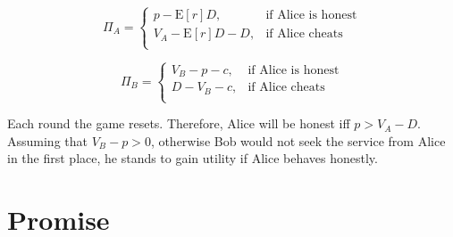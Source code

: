 \documentclass[runningheads]{llncs}
\newcommand{\sys}{Promise\xspace}
\begin{document}

\begin{equation}
\label{eq:status-quo_alice}
\Pi_A = 
\begin{cases}
    p - \mathrm{E}[r]D, & \text{if Alice is honest} \\
    V_A - \mathrm{E}[r]D-D, & \text{if Alice cheats} \\
\end{cases}
\end{equation}





\begin{equation}
\label{eq:status-quo_bob}
\Pi_B= 
\begin{cases}
V_B - p-c, & \text{if Alice is honest} \\
D -V_B -c , & \text{if Alice cheats} \\
\end{cases}
\end{equation}


Each round the game resets. 
Therefore, Alice will be honest iff $p > V_A -D$. %
Assuming that $V_B-p>0$, otherwise Bob would not seek the service from Alice in the first place, he stands to gain utility if Alice behaves honestly. %




\section{\sys}
\label{sec:promise}
\end{document}
